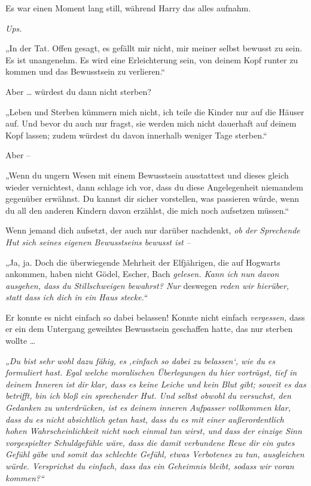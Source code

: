 {Es war einen Moment lang still, während Harry das alles aufnahm.

\emph{Ups.}

„In der Tat. Offen gesagt, es gefällt mir nicht, mir meiner selbst bewusst zu sein. Es ist unangenehm. Es wird eine Erleichterung sein, von deinem Kopf runter zu kommen und das Bewusstsein zu verlieren.“

Aber … würdest du dann nicht sterben?

„Leben und Sterben kümmern mich nicht, ich teile die Kinder nur auf die Häuser auf. Und bevor du auch nur fragst, sie werden mich nicht dauerhaft auf deinem Kopf lassen; zudem würdest du davon innerhalb weniger Tage sterben.“

Aber --

„Wenn du ungern Wesen mit einem Bewusstsein ausstattest und dieses gleich wieder vernichtest, dann schlage ich vor, dass du diese Angelegenheit niemandem gegenüber erwähnst. Du kannst dir sicher vorstellen, was passieren würde, wenn du all den anderen Kindern davon erzählst, die mich noch aufsetzen müssen.“

Wenn jemand dich aufsetzt, der auch nur darüber nachdenkt, \emph{ob der Sprechende Hut sich seines eigenen Bewusstseins bewusst ist --}

„Ja, ja. Doch die überwiegende Mehrheit der Elfjährigen, die auf Hogwarts ankommen, haben nicht Gödel, Escher, Bach \emph{gelesen. Kann ich nun davon ausgehen, dass du Stillschweigen bewahrst? Nur} deswegen \emph{reden wir hierüber, statt dass ich dich in ein Haus stecke.“}

Er konnte es nicht einfach so dabei belassen! Konnte nicht einfach \emph{vergessen,} dass er ein dem Untergang geweihtes Bewusstsein geschaffen hatte, das nur sterben wollte …

\emph{„Du bist sehr wohl dazu fähig, es ‚einfach so dabei zu belassen`, wie du es formuliert hast. Egal welche moralischen Überlegungen du hier vorträgst, tief in deinem Inneren ist dir klar, dass es keine Leiche und kein Blut gibt; soweit es das betrifft, bin ich bloß ein sprechender Hut. Und selbst obwohl du versuchst, den Gedanken zu unterdrücken, ist es deinem inneren Aufpasser vollkommen klar, dass du es nicht absichtlich getan hast, dass du es mit einer außerordentlich hohen Wahrscheinlichkeit nicht noch einmal tun wirst, und dass der einzige Sinn vorgespielter Schuldgefühle wäre, dass die damit verbundene Reue dir ein gutes Gefühl gäbe und somit das schlechte Gefühl, etwas Verbotenes zu tun, ausgleichen würde. Versprichst du einfach, dass das ein Geheimnis bleibt, sodass wir voran kommen?“}

}
